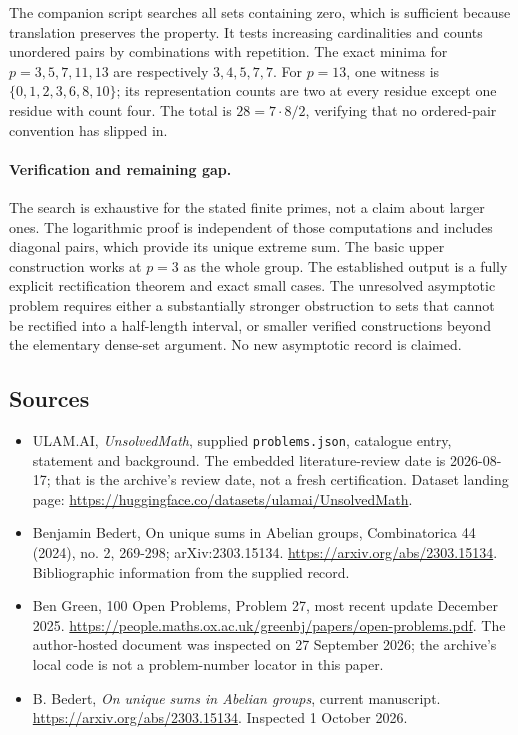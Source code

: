 \documentclass[11pt,a4paper]{article}
\begin{document}
The companion script searches all sets containing zero, which is sufficient because translation preserves the property. It tests increasing cardinalities and counts unordered pairs by combinations with repetition. The exact minima for $p=3,5,7,11,13$ are respectively $3,4,5,7,7$. For $p=13$, one witness is $\{0,1,2,3,6,8,10\}$; its representation counts are two at every residue except one residue with count four. The total is $28=7\cdot8/2$, verifying that no ordered-pair convention has slipped in.

\paragraph{Verification and remaining gap.}
The search is exhaustive for the stated finite primes, not a claim about larger ones. The logarithmic proof is independent of those computations and includes diagonal pairs, which provide its unique extreme sum. The basic upper construction works at $p=3$ as the whole group. The established output is a fully explicit rectification theorem and exact small cases. The unresolved asymptotic problem requires either a substantially stronger obstruction to sets that cannot be rectified into a half-length interval, or smaller verified constructions beyond the elementary dense-set argument. No new asymptotic record is claimed.

\subsection{Sources}

{\small

\begin{itemize}

\item[\hypertarget{source:statement:1}{S1}] ULAM.AI, \emph{UnsolvedMath}, supplied \texttt{problems.json}, catalogue entry, statement and background. The embedded literature-review date is 2026-08-17; that is the archive’s review date, not a fresh certification. Dataset landing page: \url{https://huggingface.co/datasets/ulamai/UnsolvedMath}.

\item[\hypertarget{source:statement:2}{S2}] Benjamin Bedert, On unique sums in Abelian groups, Combinatorica 44 (2024), no. 2, 269-298; arXiv:2303.15134. \url{https://arxiv.org/abs/2303.15134}. Bibliographic information from the supplied record.

\item[\hypertarget{source:statement:3}{S3}] Ben Green, 100 Open Problems, Problem 27, most recent update December 2025. \url{https://people.maths.ox.ac.uk/greenbj/papers/open-problems.pdf}. The author-hosted document was inspected on 27 September 2026; the archive’s local code is not a problem-number locator in this paper.

\item[E1] B. Bedert, \emph{On unique sums in Abelian groups}, current manuscript. \url{https://arxiv.org/abs/2303.15134}. Inspected 1 October 2026.

\end{itemize}

}

\label{end:statement}
\end{document}
